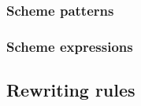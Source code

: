 


\subsubsection{Scheme patterns}


\subsubsection{Scheme expressions}

\subsection{Rewriting rules}






